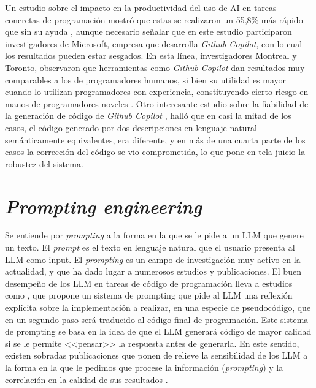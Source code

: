 Un estudio sobre el impacto en la productividad del uso de AI en tareas concretas de programación mostró que estas se realizaron un 55,8\% más rápido que sin su ayuda \citep{pengImpactAIDeveloper2023a}, aunque necesario señalar que en este estudio participaron investigadores de Microsoft, empresa que desarrolla \textit{Github Copilot}, con lo cual los resultados pueden estar sesgados. En esta línea, investigadores Montreal y Toronto, observaron que herramientas como \textit{Github Copilot} dan resultados muy comparables a los de programadores humanos, si bien su utilidad es mayor cuando lo utilizan programadores con experiencia, constituyendo cierto riesgo en manos de programadores noveles \citep{moradidakhelGitHubCopilotAI2023}. Otro interesante estudio sobre la fiabilidad de la generación de código de \textit{Github Copilot} \citep{mastropaoloRobustnessCodeGeneration2023}, halló que en casi la mitad de los casos, el código generado por dos descripciones en lenguaje natural semánticamente equivalentes, era diferente, y en más de una cuarta parte de los casos la corrección del código se vio comprometida, lo que pone en tela juicio la robustez del sistema.

\section{\textit{Prompting engineering}}

Se entiende por \textit{prompting} a la forma en la que se le pide a un LLM que genere un texto. El \textit{prompt} es el texto en lenguaje natural que el usuario presenta al LLM como input. El \textit{prompting} es un campo de investigación muy activo en la actualidad, y que ha dado lugar a numerosos estudios y publicaciones. El buen desempeño de los LLM en tareas de código de programación lleva a estudios como \cite{liStructuredChainofThoughtPrompting2023}, que propone un sistema de prompting que pide al LLM una reflexión explícita sobre la implementación a realizar, en una especie de pseudocódigo, que en un segundo paso será traducido al código final de programación. Este sistema de prompting se basa en la idea de que el LLM generará código de mayor calidad si se le permite <<pensar>> la respuesta antes de generarla. En este sentido, existen sobradas publicaciones que ponen de relieve la sensibilidad de los LLM a la forma en la que le pedimos que procese la información (\textit{prompting}) y la correlación en la calidad de sus resultados \citep{zhouLeasttoMostPromptingEnables2023,weiChainofThoughtPromptingElicits2023,LLMPromptingGuide}.
 
